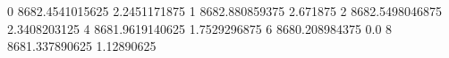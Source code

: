 0 8682.4541015625 2.2451171875
1 8682.880859375 2.671875
2 8682.5498046875 2.3408203125
4 8681.9619140625 1.7529296875
6 8680.208984375 0.0
8 8681.337890625 1.12890625
